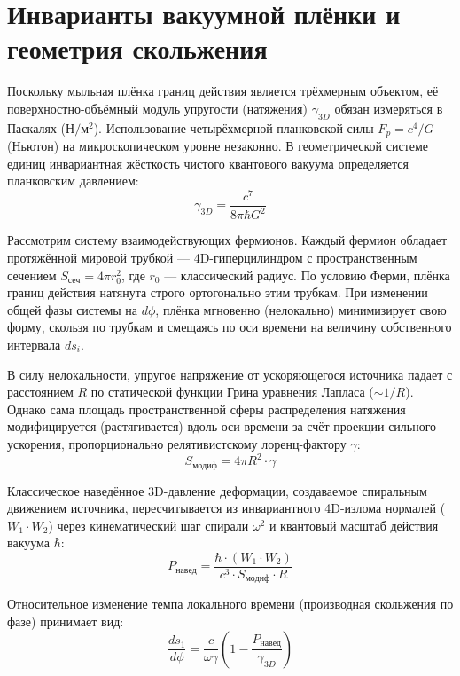 \documentclass[twocolumn,PRD,amsmath,amssymb,superscriptaddress]{revtex4-1}
\begin{document}
\section{Инварианты вакуумной плёнки и геометрия скольжения}
Поскольку мыльная плёнка границ действия является трёхмерным объектом, её поверхностно-объёмный модуль упругости (натяжения) $\gamma_{3D}$ обязан измеряться в Паскалях ($\text{Н}/\text{м}^2$). Использование четырёхмерной планковской силы $F_p = c^4/G$ (Ньютон) на микроскопическом уровне незаконно. В геометрической системе единиц инвариантная жёсткость чистого квантового вакуума определяется планковским давлением:
\begin{equation}
\gamma_{3D} = \frac{c^7}{8\pi \hbar G^2}
\end{equation}

Рассмотрим систему взаимодействующих фермионов. Каждый фермион обладает протяжённой мировой трубкой --- 4D-гиперцилиндром с пространственным сечением $S_{сеч} = 4\pi r_0^2$, где $r_0$ --- классический радиус. По условию Ферми, плёнка границ действия натянута строго ортогонально этим трубкам. При изменении общей фазы системы на $d\phi$, плёнка мгновенно (нелокально) минимизирует свою форму, скользя по трубкам и смещаясь по оси времени на величину собственного интервала $ds_i$. 

В силу нелокальности, упругое напряжение от ускоряющегося источника падает с расстоянием $R$ по статической функции Грина уравнения Лапласа ($\sim 1/R$). Однако сама площадь пространственной сферы распределения натяжения модифицируется (растягивается) вдоль оси времени за счёт проекции сильного ускорения, пропорционально релятивистскому лоренц-фактору $\gamma$:
\begin{equation}
S_{модиф} = 4\pi R^2 \cdot \gamma
\end{equation}

Классическое наведённое 3D-давление деформации, создаваемое спиральным движением источника, пересчитывается из инвариантного 4D-излома нормалей ($W_1 \cdot W_2$) через кинематический шаг спирали $\omega^2$ и квантовый масштаб действия вакуума $\hbar$:
\begin{equation}
P_{навед} = \frac{\hbar \cdot (W_1 \cdot W_2)}{c^3 \cdot S_{модиф} \cdot R}
\end{equation}

Относительное изменение темпа локального времени (производная скольжения по фазе) принимает вид:
\begin{equation}
\frac{ds_1}{d\phi} = \frac{c}{\omega \gamma} \left( 1 - \frac{P_{навед}}{\gamma_{3D}} \right)
\end{equation}
\end{document}
